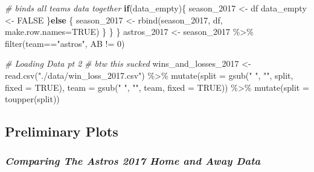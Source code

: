 \documentclass[
]{article}
\newenvironment{Shaded}{\begin{snugshade}}{\end{snugshade}}
\newcommand{\AttributeTok}[1]{\textcolor[rgb]{0.77,0.63,0.00}{#1}}
\newcommand{\CommentTok}[1]{\textcolor[rgb]{0.56,0.35,0.01}{\textit{#1}}}
\newcommand{\ConstantTok}[1]{\textcolor[rgb]{0.00,0.00,0.00}{#1}}
\newcommand{\ControlFlowTok}[1]{\textcolor[rgb]{0.13,0.29,0.53}{\textbf{#1}}}
\newcommand{\DecValTok}[1]{\textcolor[rgb]{0.00,0.00,0.81}{#1}}
\newcommand{\FunctionTok}[1]{\textcolor[rgb]{0.00,0.00,0.00}{#1}}
\newcommand{\NormalTok}[1]{#1}
\newcommand{\OtherTok}[1]{\textcolor[rgb]{0.56,0.35,0.01}{#1}}
\newcommand{\SpecialCharTok}[1]{\textcolor[rgb]{0.00,0.00,0.00}{#1}}
\newcommand{\StringTok}[1]{\textcolor[rgb]{0.31,0.60,0.02}{#1}}
\begin{document}
\begin{Shaded}
\begin{Highlighting}[]
    \CommentTok{\# binds all teams data together}
    \ControlFlowTok{if}\NormalTok{(data\_empty)\{}
\NormalTok{      season\_2017 }\OtherTok{\textless{}{-}}\NormalTok{ df}
\NormalTok{      data\_empty }\OtherTok{\textless{}{-}} \ConstantTok{FALSE}
\NormalTok{    \}}\ControlFlowTok{else}\NormalTok{ \{}
\NormalTok{      season\_2017 }\OtherTok{\textless{}{-}} \FunctionTok{rbind}\NormalTok{(season\_2017, df, }\AttributeTok{make.row.names=}\ConstantTok{TRUE}\NormalTok{)}
\NormalTok{    \}}
\NormalTok{  \}}
\NormalTok{\}}
\NormalTok{astros\_2017 }\OtherTok{\textless{}{-}}\NormalTok{ season\_2017 }\SpecialCharTok{\%\textgreater{}\%}
  \FunctionTok{filter}\NormalTok{(team}\SpecialCharTok{==}\StringTok{"astros"}\NormalTok{, AB }\SpecialCharTok{!=} \DecValTok{0}\NormalTok{)}
\end{Highlighting}
\end{Shaded}

\begin{Shaded}
\begin{Highlighting}[]
\CommentTok{\# Loading Data pt 2}
\CommentTok{\# btw this sucked}
\NormalTok{wins\_and\_losses\_2017 }\OtherTok{\textless{}{-}} \FunctionTok{read.csv}\NormalTok{(}\StringTok{"./data/win\_loss\_2017.csv"}\NormalTok{) }\SpecialCharTok{\%\textgreater{}\%}
  \FunctionTok{mutate}\NormalTok{(}\AttributeTok{split =} \FunctionTok{gsub}\NormalTok{(}\StringTok{" "}\NormalTok{, }\StringTok{""}\NormalTok{, split, }\AttributeTok{fixed =} \ConstantTok{TRUE}\NormalTok{), }\AttributeTok{team =} \FunctionTok{gsub}\NormalTok{(}\StringTok{" "}\NormalTok{, }\StringTok{""}\NormalTok{, team, }\AttributeTok{fixed =} \ConstantTok{TRUE}\NormalTok{)) }\SpecialCharTok{\%\textgreater{}\%}
  \FunctionTok{mutate}\NormalTok{(}\AttributeTok{split =} \FunctionTok{toupper}\NormalTok{(split))}
\end{Highlighting}
\end{Shaded}

\hypertarget{preliminary-plots}{%
\subsection{Preliminary Plots}\label{preliminary-plots}}

\hypertarget{comparing-the-astros-2017-home-and-away-data}{%
\subsubsection{\texorpdfstring{\emph{Comparing The Astros 2017 Home and
Away
Data}}{Comparing The Astros 2017 Home and Away Data}}\label{comparing-the-astros-2017-home-and-away-data}}
\end{document}
